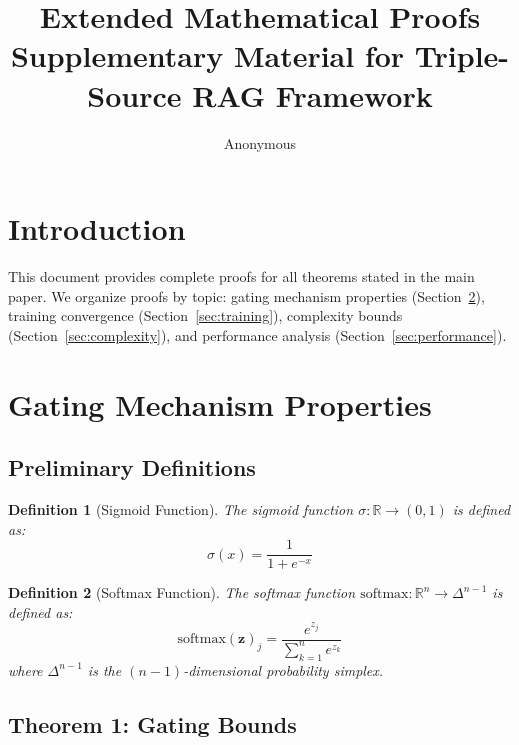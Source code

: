 \documentclass[11pt]{article}
\title{Extended Mathematical Proofs\\
\large Supplementary Material for Triple-Source RAG Framework}
\author{Anonymous}
\date{}
\newtheorem{definition}{Definition}
\begin{document}
\maketitle

\section{Introduction}

This document provides complete proofs for all theorems stated in the main paper. We organize proofs by topic: gating mechanism properties (Section~\ref{sec:gating}), training convergence (Section~\ref{sec:training}), complexity bounds (Section~\ref{sec:complexity}), and performance analysis (Section~\ref{sec:performance}).

\section{Gating Mechanism Properties}
\label{sec:gating}

\subsection{Preliminary Definitions}

\begin{definition}[Sigmoid Function]
The sigmoid function $\sigma: \mathbb{R} \to (0, 1)$ is defined as:
\begin{equation}
\sigma(x) = \frac{1}{1 + e^{-x}}
\end{equation}
\end{definition}

\begin{definition}[Softmax Function]
The softmax function $\text{softmax}: \mathbb{R}^n \to \Delta^{n-1}$ is defined as:
\begin{equation}
\text{softmax}(\mathbf{z})_j = \frac{e^{z_j}}{\sum_{k=1}^n e^{z_k}}
\end{equation}
where $\Delta^{n-1}$ is the $(n-1)$-dimensional probability simplex.
\end{definition}

\subsection{Theorem 1: Gating Bounds}
\end{document}
